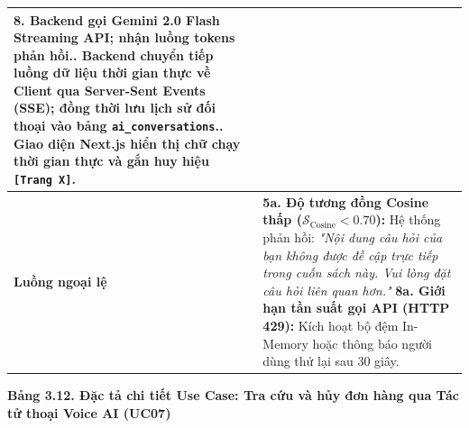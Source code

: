 \documentclass[11pt, a4paper]{report}
\begin{document}
\begin{longtable}{p{3.8cm} p{10.5cm}}
8. Backend gọi Gemini 2.0 Flash Streaming API; nhận luồng tokens phản hồi.\newline
9. Backend chuyển tiếp luồng dữ liệu thời gian thực về Client qua Server-Sent Events (SSE); đồng thời lưu lịch sử đối thoại vào bảng \texttt{ai\_conversations}.\newline
10. Giao diện Next.js hiển thị chữ chạy thời gian thực và gắn huy hiệu \texttt{[Trang X]}. \\
\midrule
\textbf{Luồng ngoại lệ} & 
\textbf{5a. Độ tương đồng Cosine thấp ($\mathcal{S}_{\text{Cosine}} < 0.70$):} Hệ thống phản hồi: \textit{"Nội dung câu hỏi của bạn không được đề cập trực tiếp trong cuốn sách này. Vui lòng đặt câu hỏi liên quan hơn."}\newline
\textbf{8a. Giới hạn tần suất gọi API (HTTP 429):} Kích hoạt bộ đệm In-Memory hoặc thông báo người dùng thử lại sau 30 giây. \\
\bottomrule
\end{longtable}

\vspace{0.3cm}
\noindent\textbf{Bảng 3.12. Đặc tả chi tiết Use Case: Tra cứu và hủy đơn hàng qua Tác tử thoại Voice AI (UC07)}
\end{document}
